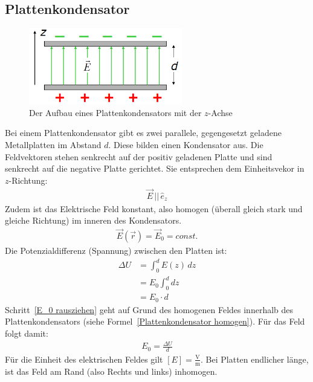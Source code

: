 \documentclass{scrartcl}
\begin{document}
\subsection{Plattenkondensator}
\begin{figure}[H]
    \centering
    \includegraphics[width=0.6\textwidth]{Plattenkondensator.png}
    \caption{Der Aufbau eines Plattenkondensators mit der $z$-Achse}
\end{figure}
Bei einem Plattenkondensator gibt es zwei parallele, gegengesetzt geladene Metallplatten im Abstand $d$.
Diese bilden einen Kondensator aus.
Die Feldvektoren stehen senkrecht auf der positiv geladenen Platte und sind senkrecht auf die negative Platte gerichtet.
Sie entsprechen dem Einheitsvekor in $z$-Richtung:
\begin{align}
    \vec{E}\,||\,\hat{e}_z
\end{align}
Zudem ist das Elektrische Feld konstant, also homogen (überall gleich stark und gleiche Richtung) im inneren des Kondensators.
\begin{align}
    \vec{E}(\vec{r})=\vec{E}_0=const.\label{Plattenkondensator homogen}
\end{align}
Die Potenzialdifferenz (Spannung) zwischen den Platten ist:
\begin{align}
    \Delta U&=\int_0^d E(z)\,dz\\
    &=E_0\int_{0}^{d}dz\label{E_0 rausziehen}\\
    &=E_0\cdot d
\end{align}
Schritt~\ref{E_0 rausziehen} geht auf Grund des homogenen Feldes innerhalb des Plattenkondensators (siehe Formel~\ref{Plattenkondensator homogen}).
Für das Feld folgt damit:
\begin{align}
    E_0=\frac{\Delta U}{d}
\end{align}
Für die Einheit des elektrischen Feldes gilt $[E]=\frac{\mathrm{V}}{\mathrm{m}}$.
Bei Platten endlicher länge, ist das Feld am Rand (also Rechts und links) inhomogen.
\end{document}
